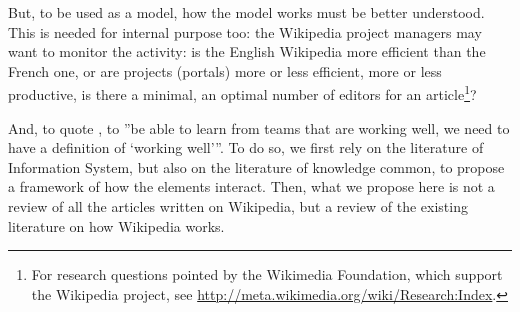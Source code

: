 But, to be used as a model, how the model works must be better understood.
This is needed for internal purpose too: the Wikipedia project managers
may want to monitor the activity: is the English Wikipedia more efficient
than the French one, or are projects (portals) more or less efficient,
more or less productive, is there a minimal, an optimal number of
editors for an article\footnote{For research questions pointed by the Wikimedia Foundation, which
support the Wikipedia project, see \url{http://meta.wikimedia.org/wiki/Research:Index}.}?

And, to quote \citet[p. 124]{CrowstonHowisonAnnabi06}, to ''be able
to learn from teams that are working well, we need to have a definition
of \textquoteleft working well\textquoteright ''. To do so, we first
rely on the literature of Information System, but also on the literature
of knowledge common, to propose a framework of how the elements interact.
Then, what we propose here is not a review of all the articles written on Wikipedia, but a review of the existing literature on how Wikipedia works.
